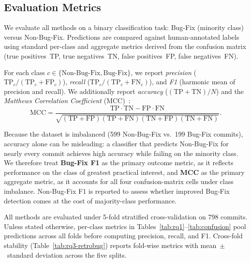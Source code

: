 
\subsection{Evaluation Metrics}
\label{sec:evaluation-metrics}

We evaluate all methods on a binary classification task:
Bug-Fix (minority class) versus Non-Bug-Fix.
Predictions are compared against human-annotated labels using
standard per-class and aggregate metrics derived from the
confusion matrix (true positives~TP, true negatives~TN,
false positives~FP, false negatives~FN).

For each class $c \in \{\text{Non-Bug-Fix}, \text{Bug-Fix}\}$, we
report \emph{precision} ($\mathrm{TP}_c / (\mathrm{TP}_c + \mathrm{FP}_c)$),
\emph{recall} ($\mathrm{TP}_c / (\mathrm{TP}_c + \mathrm{FN}_c)$), and
\emph{F1} (harmonic mean of precision and recall).
We additionally report \emph{accuracy}
($(\mathrm{TP} + \mathrm{TN}) / N$) and the
\emph{Matthews Correlation Coefficient} (MCC)~\cite{matthews1975comparison}:
\[
  \mathrm{MCC} =
  \frac{\mathrm{TP}\cdot\mathrm{TN} - \mathrm{FP}\cdot\mathrm{FN}}
       {\sqrt{(\mathrm{TP}+\mathrm{FP})(\mathrm{TP}+\mathrm{FN})
              (\mathrm{TN}+\mathrm{FP})(\mathrm{TN}+\mathrm{FN})}}.
\]

Because the dataset is imbalanced (599 Non-Bug-Fix vs.\ 199 Bug-Fix
commits), accuracy alone can be misleading: a classifier that predicts
Non-Bug-Fix for nearly every commit achieves high accuracy while failing
on the minority class.
We therefore treat \textbf{Bug-Fix F1} as the primary outcome metric,
as it reflects performance on the class of greatest practical interest,
and \textbf{MCC} as the primary aggregate metric, as it accounts for all
four confusion-matrix cells under class imbalance.
Non-Bug-Fix F1 is reported to assess whether improved Bug-Fix detection
comes at the cost of majority-class performance.

All methods are evaluated under 5-fold stratified cross-validation on
798 commits.
Unless stated otherwise, per-class metrics in
Tables~\ref{tab:rq1}--\ref{tab:confusion} pool predictions across all
folds before computing precision, recall, and F1.
Cross-fold stability (Table~\ref{tab:rq3-retrobug}) reports fold-wise
metrics with mean~$\pm$~standard deviation across the five splits.
